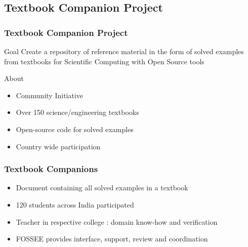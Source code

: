 \documentclass[compress,red]{beamer} %
\begin{document}
\subsection{Textbook Companion Project}

\begin{frame}
\frametitle{Textbook Companion Project}
\begin{block}{Goal}
Create a repository of reference material in the form of solved examples from textbooks for Scientific Computing with Open Source tools \pause
\end{block}
\begin{block}{About}
\begin{itemize}
	\item Community Initiative \pause
    \item Over 150 science/engineering textbooks \pause
    \item Open-source code for solved examples \pause
    \item \alert{Country wide participation}
\end{itemize}
\end{block}
\end{frame}

\begin{frame}
\frametitle{Textbook Companions}
\begin{itemize}
\item Document containing all solved examples in a textbook \pause 
\item 120 students across India participated \pause
\item Teacher in respective college : domain know-how and verification \pause
\item \alert{FOSSEE} provides interface, support, review and coordination
\end{itemize}
\end{frame}
\end{document}
